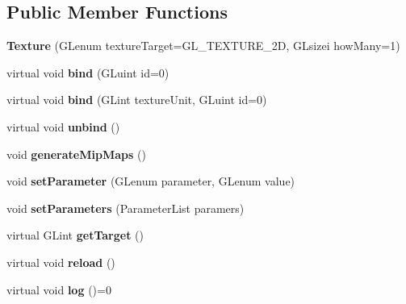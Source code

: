 \subsection*{Public Member Functions}
\begin{DoxyCompactItemize}
\item 
\mbox{\label{classflw_1_1flc_1_1Texture_a3b6675d9cfb0d57b65cca59a32138113}} 
{\bfseries Texture} (G\+Lenum texture\+Target=G\+L\+\_\+\+T\+E\+X\+T\+U\+R\+E\+\_\+2D, G\+Lsizei how\+Many=1)
\item 
\mbox{\label{classflw_1_1flc_1_1Texture_aec839f04ce20d230c74ea421cb680d6b}} 
virtual void {\bfseries bind} (G\+Luint id=0)
\item 
\mbox{\label{classflw_1_1flc_1_1Texture_a1e2606b0108a96961baf415cb7499bbb}} 
virtual void {\bfseries bind} (G\+Lint texture\+Unit, G\+Luint id=0)
\item 
\mbox{\label{classflw_1_1flc_1_1Texture_a96a5f0712aa37f70469b7567a55c86a5}} 
virtual void {\bfseries unbind} ()
\item 
\mbox{\label{classflw_1_1flc_1_1Texture_a6d9e50f8a5b5434a8b49609565db7d6c}} 
void {\bfseries generate\+Mip\+Maps} ()
\item 
\mbox{\label{classflw_1_1flc_1_1Texture_acce15bddb3502c2e58fc94e494d4754d}} 
void {\bfseries set\+Parameter} (G\+Lenum parameter, G\+Lenum value)
\item 
\mbox{\label{classflw_1_1flc_1_1Texture_aa9b40d4b1696ce652c222b5c38d988e1}} 
void {\bfseries set\+Parameters} (Parameter\+List paramers)
\item 
\mbox{\label{classflw_1_1flc_1_1Texture_a437318c485e6ed15b9dd44e2a529eb74}} 
virtual G\+Lint {\bfseries get\+Target} ()
\item 
\mbox{\label{classflw_1_1flc_1_1Texture_ac88fdab85f6f2832db0eeb71925636db}} 
virtual void {\bfseries reload} ()
\item 
\mbox{\label{classflw_1_1flc_1_1Texture_a8951294059d14c3f924c2e45a17c0bff}} 
virtual void {\bfseries log} ()=0
\end{DoxyCompactItemize}

